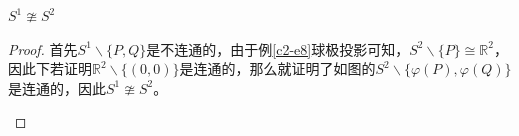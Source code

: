 \documentclass[lang=cn,10pt,device=pad]{elegantbook}
\newcommand{\dkh}[1]{\{#1\}}
\newcommand{\chadiao}{\backslash}
\begin{document}
\begin{example}[一维球面与二维球面不同胚]\label{c4-l7}
	$S^{1}\ncong S^{2}$
\end{example}
\begin{proof}首先$S^{1}\chadiao\dkh{P,Q}$是不连通的，由于例\ref{c2-e8}球极投影可知，$S^{2}\chadiao\dkh{P}\cong \mathbb{R}^{2}$，因此下若证明$\mathbb{R}^{2}\chadiao\dkh{(0,0)}$是连通的，那么就证明了如图的$S^{2}\chadiao\dkh{\varphi(P),\varphi(Q)}$是连通的，因此$S^{1}\ncong S^{2}$。
	\begin{figure}[h]
		\centering
		


\begin{tikzpicture}[x=0.75pt,y=0.75pt,yscale=-1,xscale=1]


\end{tikzpicture}
\end{figure}
\end{proof}
\end{document}
